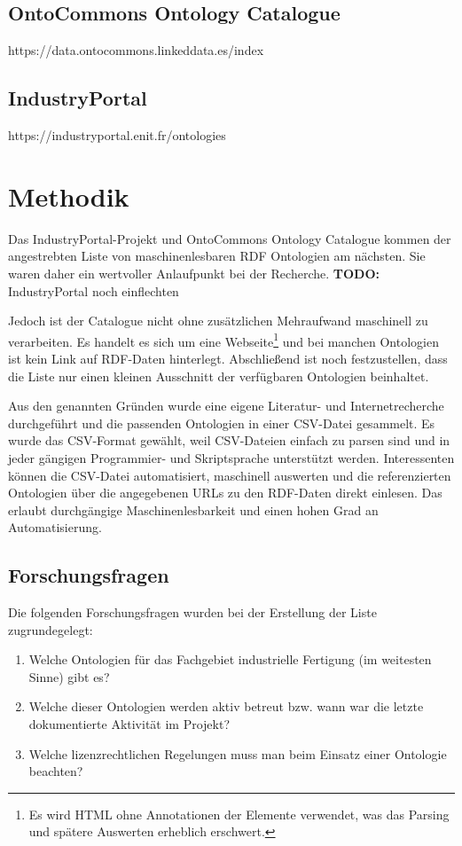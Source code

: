 \documentclass{article}
\begin{document}
\subsection{OntoCommons Ontology Catalogue}

https://data.ontocommons.linkeddata.es/index

\subsection{IndustryPortal}

https://industryportal.enit.fr/ontologies

\section{Methodik}

Das IndustryPortal-Projekt und OntoCommons Ontology Catalogue kommen der angestrebten Liste von maschinenlesbaren RDF Ontologien am nächsten.
Sie waren daher ein wertvoller Anlaufpunkt bei der Recherche.
\textbf{TODO:} IndustryPortal noch einflechten

Jedoch ist der Catalogue nicht ohne zusätzlichen Mehraufwand maschinell zu verarbeiten.
Es handelt es sich um eine Webseite\footnote{Es wird HTML ohne Annotationen der Elemente verwendet, was das Parsing und spätere Auswerten erheblich erschwert.} und bei manchen Ontologien ist kein Link auf RDF-Daten hinterlegt. Abschließend ist noch festzustellen, dass die Liste nur einen kleinen Ausschnitt der verfügbaren Ontologien beinhaltet.

Aus den genannten Gründen wurde eine eigene Literatur- und Internetrecherche durchgeführt und die passenden Ontologien in einer CSV-Datei gesammelt.
Es wurde das CSV-Format gewählt, weil CSV-Dateien einfach zu parsen sind und in jeder gängigen Programmier- und Skriptsprache unterstützt werden.
Interessenten können die CSV-Datei automatisiert, maschinell auswerten und die referenzierten Ontologien über die angegebenen URLs zu den RDF-Daten direkt einlesen.
Das erlaubt durchgängige Maschinenlesbarkeit und einen hohen Grad an Automatisierung.

\subsection{Forschungsfragen}

Die folgenden Forschungsfragen wurden bei der Erstellung der Liste zugrundegelegt:

\begin{enumerate}
    \item Welche Ontologien für das Fachgebiet industrielle Fertigung (im weitesten Sinne) gibt es?
    \item Welche dieser Ontologien werden aktiv betreut bzw. wann war die letzte dokumentierte Aktivität im Projekt?
    \item Welche lizenzrechtlichen Regelungen muss man beim Einsatz einer Ontologie beachten?
\end{enumerate}
\end{document}
